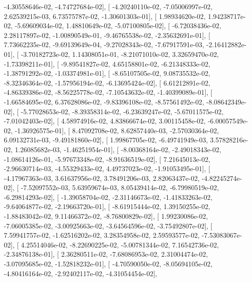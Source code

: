 \documentclass{article}
\begin{document}
         -4.30558646e-02,  -4.74727684e-02],
       [ -4.20240110e-02,  -7.05006997e-02,   2.62539215e-03,
          6.73575787e-02,  -1.30601303e-01],
       [  1.98934620e-02,   1.94238717e-02,  -5.69609034e-02,
          1.48810649e-02,  -5.07100805e-02],
       [ -6.72038436e-02,   2.28117897e-02,  -1.00890549e-01,
         -9.46765538e-02,  -2.35632691e-01],
       [  7.73662235e-02,  -9.69139649e-04,  -9.27028343e-02,
         -7.67917591e-03,  -2.16412882e-01],
       [ -3.70182723e-02,   1.14308051e-01,  -8.21071010e-02,
          3.32659470e-02,  -1.73398211e-01],
       [ -9.89541827e-02,   4.65158801e-02,  -6.21348333e-02,
         -1.38791292e-02,  -1.03374981e-01],
       [ -8.65107505e-02,   9.08735532e-02,  -8.32346364e-02,
         -1.57956194e-02,  -6.13695424e-02],
       [  6.61212891e-02,  -4.86339386e-02,  -8.56225778e-02,
         -7.10543632e-02,  -1.40399089e-01],
       [ -1.66584695e-02,   6.37628086e-02,  -9.83396108e-02,
         -8.57561492e-02,  -8.08642349e-02],
       [ -5.77028653e-02,  -8.39358314e-02,  -6.23639247e-02,
         -5.67011575e-02,  -7.01042403e-02],
       [  4.58974916e-02,   4.83866674e-02,   3.00115458e-02,
         -6.00057549e-02,  -1.36926575e-01],
       [  8.47092708e-02,   8.62857440e-03,  -2.57030364e-02,
          6.09132731e-03,  -9.49181860e-02],
       [  1.99867705e-02,  -6.49741949e-03,   3.57828216e-02,
          1.26085682e-03,  -1.46251954e-01],
       [ -8.00368164e-02,  -2.49018343e-02,  -1.08614126e-01,
         -5.97673348e-02,  -8.91636519e-02],
       [  7.21645013e-02,  -2.96630714e-03,  -4.55329433e-02,
          4.49737023e-02,  -1.91053495e-01],
       [ -4.17967363e-03,   3.61637956e-02,   3.78491206e-03,
          2.82063437e-02,  -4.82245274e-02],
       [ -7.52097552e-03,   5.63959674e-03,   8.05439414e-02,
         -6.79980519e-02,  -6.29814293e-02],
       [ -1.39058704e-02,  -2.31146673e-02,  -1.41833263e-02,
         -9.64064877e-02,  -2.19663720e-01],
       [ -8.61915444e-02,   1.39150255e-02,  -1.88483042e-02,
          9.11466372e-02,  -8.76800829e-02],
       [  1.99230086e-02,  -7.06005385e-02,  -3.00925663e-02,
         -3.64564596e-02,  -3.75492807e-02],
       [  7.59941757e-02,  -1.62516202e-02,   3.28354958e-02,
          2.59593577e-02,  -7.53083067e-02],
       [  4.25514046e-02,  -8.22690225e-02,  -5.00781344e-02,
          7.16542736e-02,  -2.34876138e-01],
       [  2.36280511e-02,  -7.68086953e-02,   2.31004474e-02,
         -3.07095685e-02,  -1.52818232e-01],
       [ -4.70590050e-02,  -8.05694105e-02,  -4.80416164e-02,
         -2.92402117e-02,  -4.31054454e-02],
\end{document}

